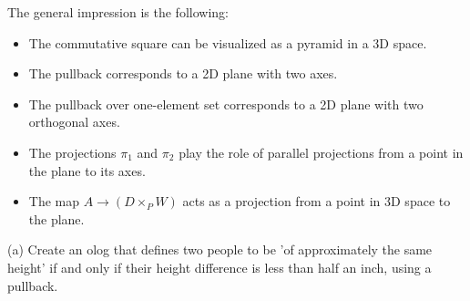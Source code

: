 \documentclass{article}
\begin{document}
The general impression is the following:
\begin{itemize}
  \item The commutative square can be visualized as a pyramid in a 3D space.
  \item The pullback corresponds to a 2D plane with two axes.
  \item The pullback over one-element set corresponds to a 2D plane with two orthogonal axes.
  \item The projections $\pi_1$ and $\pi_2$ play the role of parallel
        projections from a point in the plane to its axes.
  \item The map $A \to (D \times_P W)$ acts as a projection from a point in 3D space to the plane.
\end{itemize}

\begin{center}
\end{center}


(a) Create an olog that defines two people to be 'of approximately the same
height' if and only if their height difference is less than half an inch, using
a pullback.
\end{document}
